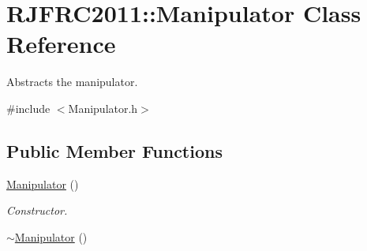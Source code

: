\hypertarget{class_r_j_f_r_c2011_1_1_manipulator}{
\section{RJFRC2011::Manipulator Class Reference}
\label{class_r_j_f_r_c2011_1_1_manipulator}
}


Abstracts the manipulator.  




{\ttfamily \#include $<$Manipulator.h$>$}

\subsection*{Public Member Functions}
\begin{DoxyCompactItemize}
\item 
\hyperlink{class_r_j_f_r_c2011_1_1_manipulator_a6038d65cea681e5d561be874c4aa8446}{Manipulator} ()
\begin{DoxyCompactList}\small\item\em Constructor. \item\end{DoxyCompactList}\item 
\hypertarget{class_r_j_f_r_c2011_1_1_manipulator_a8672c9e940c5d0fe61906fa4f0f74ab3}{
\hyperlink{class_r_j_f_r_c2011_1_1_manipulator_a8672c9e940c5d0fe61906fa4f0f74ab3}{$\sim$Manipulator} ()}
\label{class_r_j_f_r_c2011_1_1_manipulator_a8672c9e940c5d0fe61906fa4f0f74ab3}


\end{DoxyCompactItemize}
